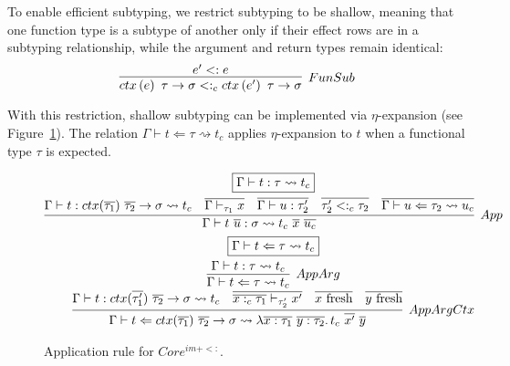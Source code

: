 \documentclass[acmsmall,review,screen]{acmart}
\newcommand{\mathframebox}[1]{\framebox{$\displaystyle #1$}}
\newcommand{\ap}{~}
\newcommand{\ctx}[1]{ctx\left(#1\right)~}
\newcommand{\step}{\rightsquigarrow}
\begin{document}
To enable efficient subtyping, we restrict subtyping to be shallow, meaning that one function type is a subtype of another only if their effect rows are in a subtyping relationship, while the argument and return types remain identical:
\[
    \infer[FunSub]{\ctx{e} \tau \to \sigma <:_c \ctx{e'} \tau\to\sigma}{e' <: e}
\]

With this restriction, shallow subtyping can be implemented via $\eta$-expansion (see Figure~\ref{fig:fim-sub-app}).
The relation $\Gamma\vdash t\Leftarrow \tau \step t_c$ applies $\eta$-expansion to $t$ when a functional type $\tau$ is expected.

\begin{figure}
    \begin{gather*}
        \mathframebox{\Gamma\vdash t : \tau \step t_c} \\
        \infer[App]{
            \Gamma\vdash t\ap\overline{u} : \sigma \step t_c \ap \overline{x} \ap \overline{u_c}
        }{
            \Gamma\vdash t : ctx(\overline{\tau_1})~\overline{\tau_2}\to \sigma \step t_c
            &
            \overline{\Gamma \vdash_{\tau_1} x}
            &
            \overline{\Gamma\vdash u : \tau_2'}
            &
            \overline{\tau_2' <:_c \tau_2}
            &
            \overline{\Gamma\vdash u \Leftarrow \tau_2 \step u_c}
        } \\
        \mathframebox{\Gamma\vdash t \Leftarrow \tau \step t_c} \\
        \begin{array}{c}
            \infer[AppArg]{
                \Gamma\vdash t \Leftarrow \tau \step t_c
            }{
                \Gamma\vdash t : \tau \step t_c
            }
            \\
            \infer[AppArgCtx]{
                \Gamma \vdash t \Leftarrow ctx(\overline{\tau_1}) ~\overline{\tau_2}\to\sigma\step \lambda \overline{x : \tau_1}~\overline{y : \tau_2}\ldotp t_c\ap \overline{x'}\ap\overline{y}
            }{
                \Gamma \vdash t : ctx(\overline{\tau_1'}) ~\overline{\tau_2}\to\sigma \step t_c
                &
                \overline{\overline{x :_c \tau_1} \vdash_{\tau_2'} x'}
                &
                \overline{x \text{ fresh}}
                &
                \overline{y \text{ fresh}}
            }
        \end{array}
    \end{gather*}
    \caption{Application rule for $Core^{im + <:}$.}
    \label{fig:fim-sub-app}
\end{figure}
\end{document}
